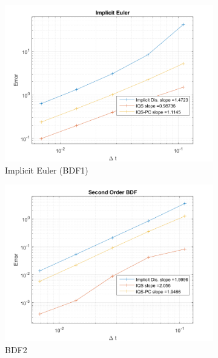 \documentclass{elsarticle}
\begin{document}
\begin{figure}[!htbp]
\centering
\begin{subfigure}[b]{0.49\textwidth}
\centering
\includegraphics[width=\linewidth]{figures/1D_conv_IE.png}
\caption{Implicit Euler (BDF1)}
\end{subfigure}
\begin{subfigure}[b]{0.49\textwidth}
\centering
\includegraphics[width=\linewidth]{figures/1D_conv_BDF2.png}
\caption{BDF2}
\end{subfigure}
\begin{subfigure}[b]{0.49\textwidth}
\centering

\end{subfigure}
\end{figure}
\end{document}
